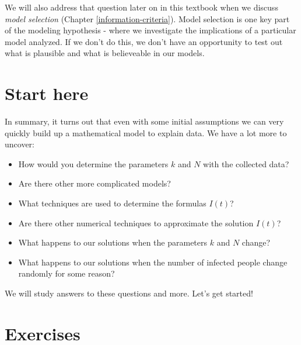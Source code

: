 \documentclass[
]{book}
\providecommand{\tightlist}{%
  \setlength{\itemsep}{0pt}\setlength{\parskip}{0pt}}
\theoremstyle{definition}
\theoremstyle{definition}
\theoremstyle{definition}
\theoremstyle{remark}
\begin{document}
We will also address that question later on in this textbook when we discuss \emph{model selection} (Chapter \ref{information-criteria}). Model selection is one key part of the modeling hypothesis - where we investigate the implications of a particular model analyzed. If we don't do this, we don't have an opportunity to test out what is plausible and what is believeable in our models.

\hypertarget{start-here}{%
\section{Start here}\label{start-here}}

In summary, it turns out that even with some initial assumptions we can very quickly build up a mathematical model to explain data. We have a lot more to uncover:

\begin{itemize}
\tightlist
\item
  How would you determine the parameters \(k\) and \(N\) with the collected data?
\item
  Are there other more complicated models?
\item
  What techniques are used to determine the formulas \(I(t)\)?
\item
  Are there other numerical techniques to approximate the solution \(I(t)\)?
\item
  What happens to our solutions when the parameters \(k\) and \(N\) change?
\item
  What happens to our solutions when the number of infected people change randomly for some reason?
\end{itemize}

We will study answers to these questions and more. Let's get started!

\newpage

\hypertarget{exercises}{%
\section{Exercises}\label{exercises}}
\end{document}
